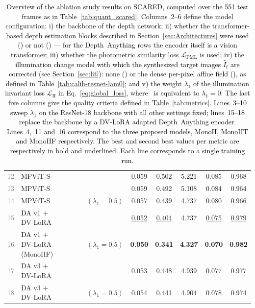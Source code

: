 \documentclass[a4paper,fleqn]{cas-dc}
\newcommand{\cmark}{\ding{51}}
\newcommand{\xmark}{\ding{55}}
\begin{document}
{\begin{table}[!t]
{\begin{tabular}{|r|l|c|c|c|c|c|c|c|c|c|}
        \textcolor{gray}{12} & MPViT-S & \cmark & \cmark & \cmark & \xmark & 0.059 & 0.502 & 5.221 & 0.085 & 0.968 \\
        \textcolor{gray}{13} & MPViT-S & \cmark & \cmark & \xmark & \xmark & 0.059 & 0.492 & 5.108 & 0.084 & 0.964 \\
        \textcolor{gray}{14} & MPViT-S & \cmark & \cmark & \xmark & \cmark $(\lambda_1 = 0.5)$ & 0.057 & 0.439 & 4.737 & 0.080 & 0.966 \\
        \hline
        \textcolor{gray}{15} & \textcolor{black}{DA v1} $+$ DV-LoRA & \cmark & \cmark & \xmark & \xmark & \underline{0.052} & \underline{0.404} & 4.737 & \underline{0.075} & \underline{0.979} \\
        \textcolor{gray}{16} & \textcolor{black}{DA v1} $+$ DV-LoRA (MonoIIF) & \cmark & \cmark & \cmark & \cmark $(\lambda_1 = 0.5)$ & \textbf{0.050} & \textbf{0.341} & \textbf{4.327} & \textbf{0.070} & \textbf{0.982}  \\
        \textcolor{gray}{17} & DA v3 $+$ DV-LoRA & \cmark & \cmark & \xmark & \xmark & 0.053 & 0.448 & 4.939 & 0.077 & 0.977  \\
        \textcolor{gray}{18} & DA v3 $+$ DV-LoRA & \cmark & \cmark & \cmark & \cmark $(\lambda_1 = 0.5)$ & 0.054 & 0.441 & 4.904 & 0.078 & 0.974 \\
        \hline
    \end{tabular}
    }
    \caption{\textcolor{black}{Overview of the ablation study results on SCARED, computed over the 551 test frames as in Table~\ref{tab:quant_scared}.
    Columns~2--6 define the model configuration: i) the backbone of the depth network; ii) whether the transformer-based depth estimation blocks described in Section~\ref{sec:Architectures} were used (\cmark) or not (\xmark) --- for the Depth~Anything rows the encoder itself is a vision transformer; iii) whether the photometric similarity loss $\mathcal{L}_\textrm{PML}$ is used; iv) the illumination change model with which the synthesized target images $\hat{I}_t$ are corrected (see Section~\ref{sec:lit}): none (\xmark) or the dense per-pixel affine field (\cmark), as defined in Table~\ref{tab:calib-resnet-lam0}; and v) the weight $\lambda_1$ of the illumination invariant loss $\mathcal{L}_\textrm{II}$ in Eq.~\eqref{eq:global_loss}, where \xmark\ is equivalent to $\lambda_1=0$.
    The last five columns give the quality criteria defined in Table~\ref{tab:metrics}.
    Lines~3--10 sweep $\lambda_1$ on the ResNet-18 backbone with all other settings fixed; lines~15--18 replace the backbone by a DV-LoRA adapted Depth~Anything encoder. Lines~4,~11 and~16 correspond to the three proposed models, MonoII, MonoIIT and MonoIIF respectively. The best and second best values per metric are respectively in bold and underlined. Each line corresponds to a single training run.}}
    \label{tab:ablation}
\end{table}
%

}
\end{document}
